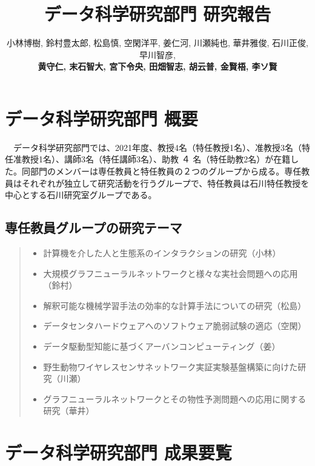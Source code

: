 \documentclass[11pt]{jarticle}
\title{データ科学研究部門 研究報告}
\author{小林博樹, 鈴村豊太郎, 松島慎, 空閑洋平, 姜仁河, 川瀬純也, 華井雅俊, 石川正俊, 早川智彦, \\
\textbf{黄守仁, 末石智大, 宮下令央, 田畑智志, 胡云普, 金賢梧, 李ソ賢}}
\begin{document}
\maketitle

\section{データ科学研究部門 概要}
　データ科学研究部門では、2021年度、教授4名（特任教授1名）、准教授3名（特任准教授1名）、講師3名（特任講師3名）、助教 ４ 名（特任助教2名）が在籍した。同部門のメンバーは専任教員と特任教員の２つのグループから成る。専任教員はそれぞれが独立して研究活動を行うグループで、特任教員は石川特任教授を中心とする石川研究室グループである。 


\subsection{専任教員グループの研究テーマ}

\begin{quote}
\begin{itemize}
\item 計算機を介した人と生態系のインタラクションの研究（小林）
\item 大規模グラフニューラルネットワークと様々な実社会問題への応用（鈴村）
\item 解釈可能な機械学習手法の効率的な計算手法についての研究（松島）
\item データセンタハードウェアへのソフトウェア脆弱試験の適応（空閑）
\item データ駆動型知能に基づくアーバンコンピューティング（姜）
\item 野生動物ワイヤレスセンサネットワーク実証実験基盤構築に向けた研究（川瀬）
\item グラフニューラルネットワークとその物性予測問題への応用に関する研究（華井）
\end{itemize}
\end{quote}



\section{データ科学研究部門 成果要覧}

\end{document}
